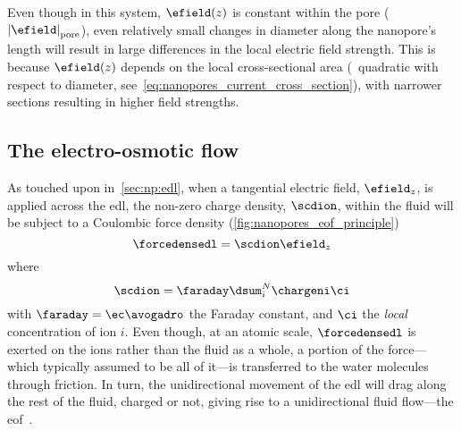 %
Even though in this system, $\efield (z)$ is constant within the pore ($\left| \efield
\right|_{\text{pore}}$), even relatively small changes in diameter along the nanopore's length will result in
large differences in the local electric field strength. This is because $\efield (z)$ depends on the local
cross-sectional area (\ie~quadratic with respect to diameter, see~\cref{eq:nanopores_current_cross_section}),
with narrower sections resulting in higher field strengths.


\subsection{The electro-osmotic flow}
%
\label{sec:np:eof}
%

As touched upon in~\cref{sec:np:edl}, when a tangential electric field, $\efield_z$, is applied across the
\gls{edl}, the non-zero charge density, $\scdion$, within the fluid will be subject to a Coulombic force
density (\cref{fig:nanopores_eof_principle})
%
\begin{equation}\label{eq:nanopores_edl_force}
  \forcedensedl = \scdion \efield_z
\end{equation}
%
where
%
\begin{equation}\label{eq:nanopores_ion_scd}
  \scdion = \faraday \dsum_i^N \chargeni \ci
\end{equation}
%
with $\faraday = \ec \avogadro$ the Faraday constant, and $\ci$ the \emph{local} concentration of ion $i$.
Even though, at an atomic scale, $\forcedensedl$ is exerted on the ions rather than the fluid as a whole, a
portion of the force---which typically assumed to be all of it---is transferred to the water molecules through
friction. In turn, the unidirectional movement of the \gls{edl} will drag along the rest of the fluid, charged
or not, giving rise to a unidirectional fluid flow---the \acrfull{eof}~\cite{Bocquet-2010}.


